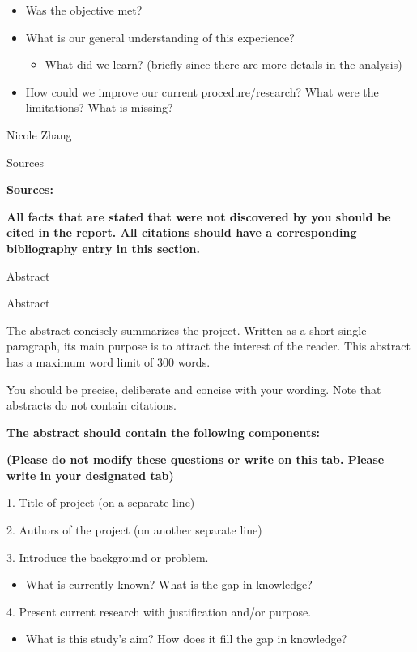 \begin{itemize}
\item
  Was the objective met?
\item
  What is our general understanding of this experience?

  \begin{itemize}
  \item
    What did we learn? (briefly since there are more details in the
    analysis)
  \end{itemize}
\item
  How could we improve our current procedure/research? What were the
  limitations? What is missing?
\end{itemize}

Nicole Zhang

Sources

\textbf{Sources:\\
}

\textbf{All facts that are stated that were not discovered by you should
be cited in the report. All citations should have a corresponding
bibliography entry in this section.}

Abstract

Abstract

The abstract concisely summarizes the project. Written as a short single
paragraph, its main purpose is to attract the interest of the reader.
This abstract has a maximum word limit of 300 words.

You should be precise, deliberate and concise with your wording. Note
that abstracts do not contain citations.

\textbf{The abstract should contain the following components:}

\textbf{(Please do not modify these questions or write on this tab.
Please write in your designated tab)}

1. Title of project (on a separate line)

2. Authors of the project (on another separate line)

3. Introduce the background or problem.

\begin{itemize}
\item
  What is currently known? What is the gap in knowledge?
\end{itemize}

4. Present current research with justification and/or purpose.

\begin{itemize}
\item
  What is this study's aim? How does it fill the gap in knowledge?
\end{itemize}

